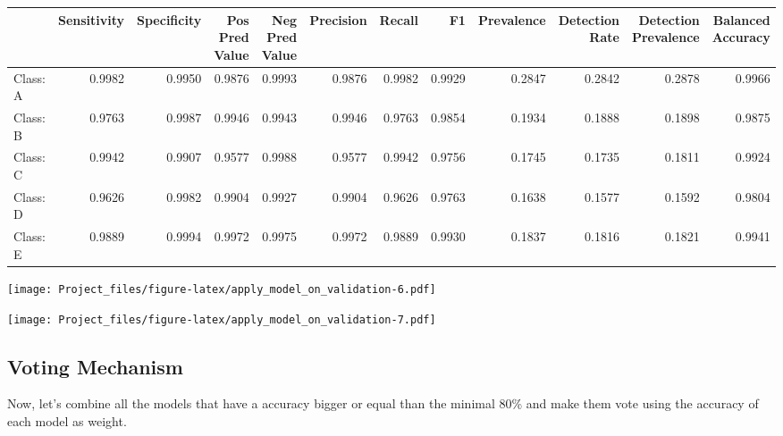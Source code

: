 \documentclass[]{article}
\begin{document}
\begingroup\fontsize{11}{13}\selectfont

\begin{tabular}{l|r|r|r|r|r|r|r|r|r|r|r}
\hline
  & Sensitivity & Specificity & Pos Pred Value & Neg Pred Value & Precision & Recall & F1 & Prevalence & Detection Rate & Detection Prevalence & Balanced Accuracy\\
\hline
Class: A & 0.9982 & 0.9950 & 0.9876 & 0.9993 & 0.9876 & 0.9982 & 0.9929 & 0.2847 & 0.2842 & 0.2878 & 0.9966\\
\hline
Class: B & 0.9763 & 0.9987 & 0.9946 & 0.9943 & 0.9946 & 0.9763 & 0.9854 & 0.1934 & 0.1888 & 0.1898 & 0.9875\\
\hline
Class: C & 0.9942 & 0.9907 & 0.9577 & 0.9988 & 0.9577 & 0.9942 & 0.9756 & 0.1745 & 0.1735 & 0.1811 & 0.9924\\
\hline
Class: D & 0.9626 & 0.9982 & 0.9904 & 0.9927 & 0.9904 & 0.9626 & 0.9763 & 0.1638 & 0.1577 & 0.1592 & 0.9804\\
\hline
Class: E & 0.9889 & 0.9994 & 0.9972 & 0.9975 & 0.9972 & 0.9889 & 0.9930 & 0.1837 & 0.1816 & 0.1821 & 0.9941\\
\hline
\end{tabular}

\endgroup{}

\texttt{[image: Project\_files/figure-latex/apply\_model\_on\_validation-6.pdf]}

\texttt{[image: Project\_files/figure-latex/apply\_model\_on\_validation-7.pdf]}

\subsection{Voting Mechanism}\label{voting-mechanism}

Now, let's combine all the models that have a accuracy bigger or equal
than the minimal 80\% and make them vote using the accuracy of each
model as weight.
\end{document}
